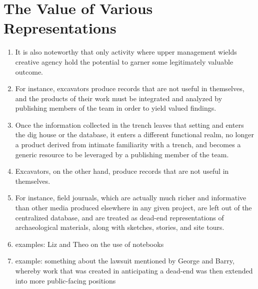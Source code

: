 \documentclass{article}
\begin{document}
\section{The Value of Various Representations}
\begin{enumerate}
  \item It is also noteworthy that only activity where upper management wields creative agency hold the potential to garner some legitimately valuable outcome.
  \item For instance, excavators produce records that are not useful in themselves, and the products of their work must be integrated and analyzed by publishing members of the team in order to yield valued findings.
  \item Once the information collected in the trench leaves that setting and enters the dig house or the database, it enters a different functional realm, no longer a product derived from intimate familiarity with a trench, and becomes a generic resource to be leveraged by a publishing member of the team.
  \item Excavators, on the other hand, produce records that are not useful in themselves.
  \item For instance, field journals, which are actually much richer and informative than other media produced elsewhere in any given project, are left out of the centralized database, and are treated as dead-end representations of archaeological materials, along with sketches, stories, and site tours.
  \item examples: Liz and Theo on the use of notebooks
  \item example: something about the lawsuit mentioned by George and Barry, whereby work that was created in anticipating a dead-end was then extended into more public-facing positions

\end{enumerate}
\end{document}
